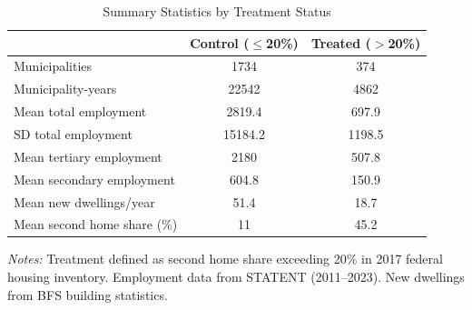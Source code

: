 \begin{table}[htbp]
\centering
\caption{Summary Statistics by Treatment Status}
\label{tab:summary}
\begin{tabular}{lcc}
\toprule
 & Control ($\leq$20\%) & Treated ($>$20\%) \\
\midrule
Municipalities & 1734 & 374 \\
Municipality-years & 22542 & 4862 \\
\addlinespace
Mean total employment & 2819.4 & 697.9 \\
SD total employment & 15184.2 & 1198.5 \\
Mean tertiary employment & 2180 & 507.8 \\
Mean secondary employment & 604.8 & 150.9 \\
Mean new dwellings/year & 51.4 & 18.7 \\
\addlinespace
Mean second home share (\%) & 11 & 45.2 \\
\bottomrule
\end{tabular}
\begin{tablenotes}[flushleft]\small
\item \textit{Notes:} Treatment defined as second home share exceeding 20\% in 2017 federal housing inventory.
Employment data from STATENT (2011--2023). New dwellings from BFS building statistics.
\end{tablenotes}
\end{table}
